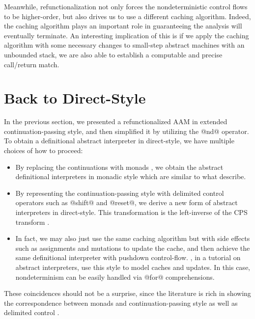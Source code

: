 \documentclass[acmsmall, screen]{acmart}\settopmatter{}
\begin{document}
Meanwhile, refunctionalization not only forces the nondeterministic control flows to be higher-order,
but also drives us to use a different caching algorithm.
Indeed, the caching algorithm plays an important role in guaranteeing the analysis will eventually terminate.
An interesting implication of this is if we apply the caching algorithm with some
necessary changes to small-step abstract machines with an unbounded stack, we are
also able to establish a computable and precise call/return match.

\section{Back to Direct-Style} \label{directstyle}

In the previous section, we presented a refunctionalized AAM in extended continuation-passing style,
and then simplified it by utilizing the @nd@ operator.
To obtain a definitional abstract interpreter in direct-style, we have multiple choices of how to proceed:

\begin{itemize}
  \item By replacing the continuations with monads \cite{filinski1994representing},
    we obtain the abstract definitional interpreters in monadic style which are similar to what
    \citet{darais2017abstracting} describe.
  \item By representing the continuation-passing style with delimited control operators
    such as @shift@ and @reset@, we derive a new form of abstract interpreters in direct-style.
    This transformation is the left-inverse of the CPS transform \cite{DBLP:journals/scp/Danvy94, DBLP:conf/lfp/DanvyL92}.
  \item In fact, we may also just use the same caching algorithm but with side effects such as
    assignments and mutations to update the cache, and then achieve the same definitional
    interpreter with pushdown control-flow. , in a tutorial on abstract
    interpreters, use this style to model caches and updates.
    In this case, nondeterminism can be easily handled via @for@ comprehensions.
\end{itemize}

These coincidences should not be a surprise, since the literature is rich
in showing the correspondence between monads and continuation-passing style as well as
delimited control \cite{Danvy:1990:AC:91556.91622, wadler1992essence,
danvy1992representing, moggi1991notions}.
\end{document}
